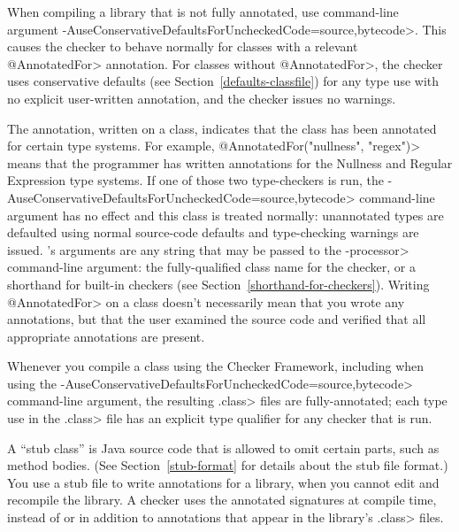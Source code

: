
\begin{sloppypar}
When compiling a library that is not fully annotated, use command-line
argument \<-AuseConservativeDefaultsForUncheckedCode=source,bytecode>.  This causes
the checker to behave normally for classes with a relevant \<@AnnotatedFor>
annotation.  For classes without \<@AnnotatedFor>, the checker uses
conservative defaults
(see Section~\ref{defaults-classfile}) for any type use with no explicit
user-written annotation, and the checker issues no warnings.
\end{sloppypar}

The  annotation, written on a
class, indicates that the class has been annotated for certain type
systems.  For example, \<@AnnotatedFor(\ttlcb"nullness", "regex"\ttrcb)> means that
the programmer has written annotations for the Nullness and Regular
Expression type systems.  If one of those two type-checkers is run,
the \<-AuseConservativeDefaultsForUncheckedCode=source,bytecode> command-line argument
has no effect and this class is treated normally:
unannotated types are defaulted using normal source-code
defaults and type-checking warnings are issued.
's arguments are any string that
may be passed to the \<-processor> command-line argument:  the
fully-qualified class name for the checker, or a shorthand for built-in
checkers (see Section~\ref{shorthand-for-checkers}).
Writing \<@AnnotatedFor> on a class doesn't necessarily mean that you wrote
any annotations, but that the user examined the source code and verified
that all appropriate annotations are present.

\begin{sloppypar}
Whenever you compile a class using the Checker Framework, including when
using the \<-AuseConservativeDefaultsForUncheckedCode=source,bytecode> command-line
argument, the resulting \<.class> files are fully-annotated; each type use
in the \<.class> file has an explicit type qualifier for any checker that
is run.
\end{sloppypar}



A ``stub class'' is Java source code that is allowed to omit certain parts,
such as method bodies.  (See Section~\ref{stub-format} for details
about the stub file format.)  You use a stub file to write annotations
for a library, when you cannot edit and recompile the library.  A
checker uses the annotated signatures at compile time, instead of or in
addition to annotations that appear in the library's \<.class> files.

